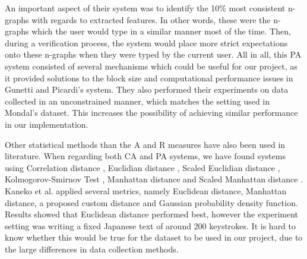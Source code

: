 \documentclass[informationsecurity]{gucmasterproject}
\begin{document}
An important aspect of their system was to identify the 10\% most consistent n-graphs with regards to extracted features.
In other words, these were the n-graphs which the user would type in a similar manner most of the time.
Then, during a verification process, the system would place more strict expectations onto these n-graphs when they were typed by the current user.
All in all, this PA system consisted of several mechanisms which could be useful for our project, as it provided solutions to the block size and computational performance issues in Gunetti and Picardi's \cite{gnp} system.
They also performed their experiments on data collected in an unconstrained manner, which matches the setting used in Mondal's \cite{mondal} dataset. 
This increases the possibility of achieving similar performance in our implementation.

Other statistical methods than the A and R measures have also been used in literature.
When regarding both CA and PA systems, we have found systems using Correlation distance \cite{mondal}, Euclidian distance \cite{Monrose, Kaneko}, Scaled Euclidian distance \cite{mondal}, Kolmogorov-Smirnov Test \cite{park}, Manhattan distance \cite{Kaneko} and Scaled Manhattan distance \cite{BOURS201236}.
Kaneko et al. \cite{Kaneko} applied several metrics, namely Euclidean distance, Manhattan distance, a proposed custom distance and Gaussian probability density function. Results showed that Euclidean distance performed best, however the experiment setting was writing a fixed Japanese text of around 200 keystrokes.
It is hard to know whether this would be true for the dataset to be used in our project, due to the large differences in data collection methods.
\end{document}
